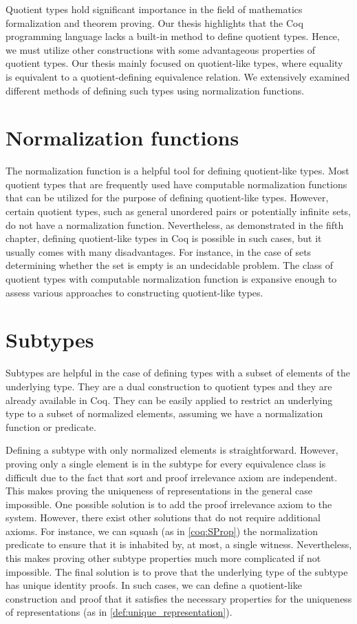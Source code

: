 Quotient types hold significant importance in the field of mathematics formalization and theorem proving. Our thesis highlights that the Coq programming language lacks a built-in method to define quotient types. Hence, we must utilize other constructions with some advantageous properties of quotient types. Our thesis mainly focused on quotient-like types, where equality is equivalent to a quotient-defining equivalence relation. We extensively examined different methods of defining such types using normalization functions.

\section{Normalization functions}
The normalization function is a helpful tool for defining quotient-like types. Most quotient types that are frequently used have computable normalization functions that can be utilized for the purpose of defining quotient-like types. However, certain quotient types, such as general unordered pairs or potentially infinite sets, do not have a normalization function. Nevertheless, as demonstrated in the fifth chapter, defining quotient-like types in Coq is possible in such cases, but it usually comes with many disadvantages. For instance, in the case of sets determining whether the set is empty is an undecidable problem. The class of quotient types with computable normalization function is expansive enough to assess various approaches to constructing quotient-like types.
\section{Subtypes}
Subtypes are helpful in the case of defining types with a subset of elements of the underlying type. They are a dual construction to quotient types and they are already available in Coq. They can be easily applied to restrict an underlying type to a subset of normalized elements, assuming we have a normalization function or predicate.

Defining a subtype with only normalized elements is straightforward. However, proving only a single element is in the subtype for every equivalence class is difficult due to the fact that  sort and proof irrelevance axiom are independent. This makes proving the uniqueness of representations in the general case impossible. One possible solution is to add the proof irrelevance axiom to the system. However, there exist other solutions that do not require additional axioms. For instance, we can squash (as in \ref{coq:SProp}) the normalization predicate to ensure that it is inhabited by, at most, a single witness. Nevertheless, this makes proving other subtype properties much more complicated if not impossible. The final solution is to prove that the underlying type of the subtype has unique identity proofs. In such cases, we can define a quotient-like construction and proof that it satisfies the necessary properties for the uniqueness of representations (as in \ref{def:unique_representation}).

